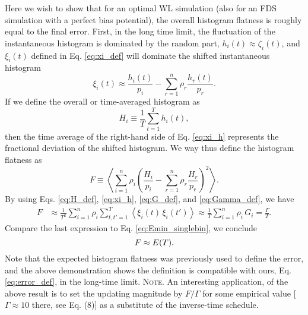 \documentclass[reprint, superscriptaddress, floatfix]{revtex4-1}
\newcommand{\note}[1]{{\color{DarkGreen}\footnotesize \textsc{Note.} #1}}
\begin{document}
Here we wish to show that for an optimal WL simulation
(also for an FDS simulation with a perfect bias potential),
the overall histogram flatness
is roughly equal to the final error.
%
First, in the long time limit, the fluctuation of
the instantaneous histogram is dominated by the random part,
$h_i(t) \approx \zeta_i(t)$,
and $\xi_i(t)$ defined in Eq. \eqref{eq:xi_def}
will dominate the shifted instantaneous histogram
%
\begin{equation}
\xi_i(t) \approx
\frac{ h_i(t) } { p_i }
- \sum_{r = 1}^n \rho_r \frac{ h_r(t) } { p_r }
.
\label{eq:xi_h}
\end{equation}
%
If we define the overall or time-averaged histogram as
\begin{equation}
  H_i \equiv \frac{1}{T} \sum_{t=1}^T h_i(t)
  ,
  \label{eq:H_def}
\end{equation}
then the time average of the right-hand side of Eq. \eqref{eq:xi_h}
represents the fractional deviation of the shifted histogram.
%
We way thus define the histogram flatness as
%
\begin{equation}
  F
  \equiv
  \left\langle
  \sum_{i = 1}^n \rho_i
  \left(
  \frac{ H_i } { p_i }
  - \sum_{r = 1}^n \rho_r \frac{ H_r } { p_r }
  \right)^2
  \right\rangle
  .
  \label{eq:F_def}
\end{equation}
%
By using Eqs. \eqref{eq:H_def}, \eqref{eq:xi_h},
\eqref{eq:G_def}, and \eqref{eq:Gamma_def}, we have
%
\begin{align*}
  F
  &\approx
  \frac{1}{T^2}
  \sum_{i = 1}^n \rho_i
  \sum_{t, t' = 1}^T
  \left\langle
  \xi_i(t) \, \xi_i(t')
  \right\rangle
  \approx
  \frac{1}{T}
  \sum_{i = 1}^n \rho_i \, G_i
  =
  \frac{ \Gamma } { T }
  .
\end{align*}
%
Compare the last expression to Eq. \eqref{eq:Emin_singlebin},
we conclude
\begin{equation}
  F \approx E(T)
  .
  \notag
\end{equation}
Note that the expected histogram flatness
was previously used to define the error\cite{zhou2005, zhou2008},
and the above demonstration shows the definition
is compatible with ours, Eq. \eqref{eq:error_def}, in the long-time limit.
%
\note{
An interesting application\cite{zhou2008},
of the above result is
to set the updating magnitude by $F/\Gamma$
for some empirical value [$\Gamma \approx 10$ there, see Eq. (8)]
as a substitute of the inverse-time schedule.
}
\end{document}
